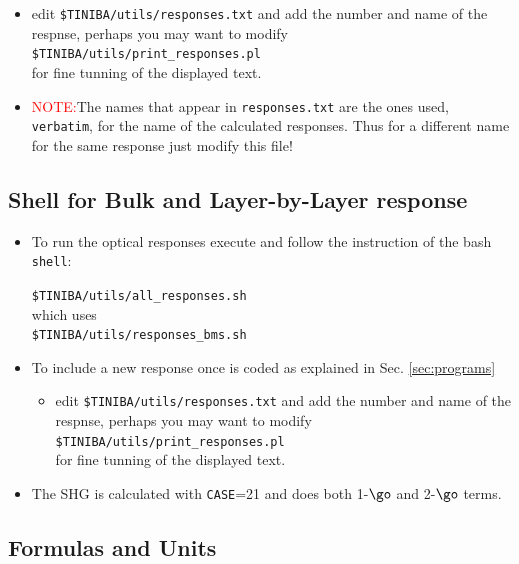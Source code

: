 \documentclass[12pt,leqno]{article}
\numberwithin{equation}{section}
\begin{document}
\begin{itemize}
\begin{itemize}
\begin{itemize}
\item edit
\verb=$TINIBA/utils/responses.txt=  
and add the
 number and name of the respnse, perhaps you may want to modify\\
\verb=$TINIBA/utils/print_responses.pl=\\ for fine tunning
of the displayed text. 
\item\textcolor{red}{NOTE:}The names that appear in
  \verb=responses.txt= are the ones used, \verb=verbatim=, for the name
  of the calculated responses. Thus for a different name for the same
  response just modify this file!
\end{itemize}
\end{itemize}

\end{itemize}


\subsection{Shell for Bulk and Layer-by-Layer response}

\begin{itemize}

\item To run the optical responses execute and follow the instruction of the bash \verb=shell=:

  \verb=$TINIBA/utils/all_responses.sh=\\
which uses\\
\verb=$TINIBA/utils/responses_bms.sh=

\item To include a new response once is coded as explained in
 Sec. \ref{sec:programs} 

\begin{itemize}
\item edit
\verb=$TINIBA/utils/responses.txt=  
and add the
 number and name of the respnse, perhaps you may want to modify\\
\verb=$TINIBA/utils/print_responses.pl=\\ for fine tunning
of the displayed text.
\end{itemize}
\item The SHG is calculated with \verb=CASE==21 and does both 1-$\go$
  and 2-$\go$ terms.
\end{itemize}

\subsection{Formulas and Units}
\end{document}
